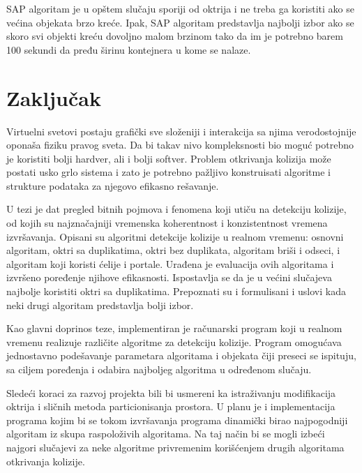 \documentclass[12pt,oneside]{memoir}
\begin{document}
SAP algoritam je u opštem slučaju sporiji od oktrija i ne treba ga koristiti ako se većina objekata 
brzo kreće.
Ipak, SAP algoritam predstavlja najbolji izbor ako se skoro svi objekti kreću dovoljno malom brzinom 
tako da im je potrebno barem 100 sekundi da pređu širinu kontejnera u kome se nalaze.


\chapter{Zaključak}
\label{sec:zakljucak}

Virtuelni svetovi postaju grafički sve složeniji i interakcija sa njima verodostojnije oponaša fiziku pravog sveta.
Da bi takav nivo kompleksnosti bio moguć potrebno je koristiti bolji hardver, ali i bolji softver. 
Problem otkrivanja kolizija može postati usko grlo sistema i zato je potrebno pažljivo konstruisati 
algoritme i strukture podataka za njegovo efikasno rešavanje.

U tezi je dat pregled bitnih pojmova i fenomena koji utiču na detekciju kolizije, 
od kojih su najznačajniji vremenska koherentnost i konzistentnost vremena izvršavanja.
Opisani su algoritmi detekcije kolizije u realnom vremenu: osnovni algoritam, oktri sa duplikatima, oktri bez duplikata,
algoritam briši i odseci, i algoritam koji koristi ćelije i portale. 
Urađena je evaluacija ovih algoritama i izvršeno poređenje njihove efikasnosti.
Ispostavlja se da je u većini slučajeva najbolje koristiti oktri sa duplikatima.
Prepoznati su i formulisani i uslovi kada neki drugi algoritam predstavlja bolji izbor.

Kao glavni doprinos teze, implementiran je računarski program koji u realnom vremenu realizuje različite algoritme
za detekciju kolizije.
Program omogućava jednostavno podešavanje parametara algoritama i objekata čiji preseci se ispituju,
sa ciljem poređenja i odabira najboljeg algoritma u određenom slučaju.

Sledeći koraci za razvoj projekta bili bi usmereni ka istraživanju modifikacija oktrija 
i sličnih metoda particionisanja prostora.
U planu je i implementacija programa kojim bi se tokom izvršavanja programa dinamički birao najpogodniji algoritam iz skupa raspoloživih algoritama.
Na taj način bi se mogli izbeći najgori slučajevi za neke algoritme privremenim korišćenjem drugih  
algoritama otkrivanja kolizije.



\literatura

\backmatter


\end{document}
